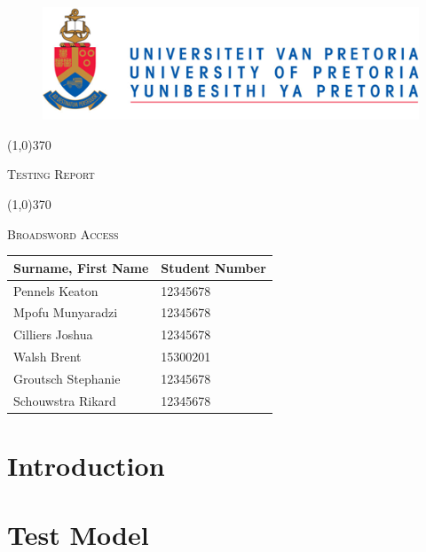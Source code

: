 \documentclass[english]{article}
\begin{document}
	
	\begin{figure}
		\includegraphics[width=\linewidth]{up_logo.png}
	\end{figure}
	
	\begin{center}
	 \line(1,0){370}
	\\[0.2cm]
    {\scshape\Large Testing Report  \par}
	\vspace{0.1cm}
	\line(1,0){370}
	\\[0.8cm]
	
	 {\scshape\Large Broadsword Access \par}
	\vspace{0.9cm}
	
	\begin{tabu} to \textwidth { X[l] X[l]}
		\hline
		\textbf{Surname, First Name  }	& \textbf{Student Number}	\\ \hline \hline
		Pennels 	Keaton   &12345678	\\ \hline
		Mpofu	Munyaradzi   &12345678		\\ \hline
		Cilliers	Joshua   &12345678		\\ \hline
		Walsh     Brent    &15300201		\\ \hline
		Groutsch	Stephanie    &12345678		\\ \hline
		Schouwstra	Rikard    &12345678		\\ \hline
		\hline
	\end{tabu}
	
	\end{center}
	
	
	\newpage
	\tableofcontents

	\newpage
	
	\section{Introduction}

	
	\section{Test Model}
\end{document}
